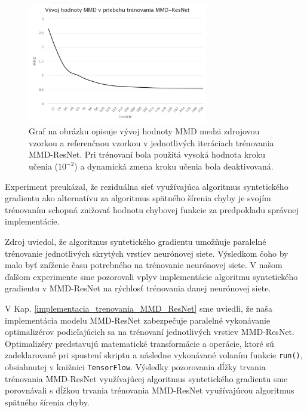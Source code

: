 \begin{figure}
\centerline{\includegraphics[width=0.7\textwidth]{images/experimenty/experiment1.png}}
\caption[Vývoj hodnoty MMD v priebehu trénovania MMD-ResNet]{Graf na obrázku opisuje vývoj hodnoty MMD medzi zdrojovou vzorkou a referenčnou vzorkou v jednotlivých iteráciach trénovania MMD-ResNet. Pri trénovaní bola použitá vysoká hodnota kroku učenia ($10^{-2}$) a dynamická zmena kroku učenia bola deaktivovaná.}
\label{vysledok1}
\end{figure}

Experiment preukázal, že reziduálna sieť využívajúca algoritmus syntetického gradientu ako alternatívu za algoritmus spätného šírenia chyby je svojím trénovaním schopná znižovať hodnotu chybovej funkcie za predpokladu správnej implementácie.

Zdroj \cite{Jaderberg2016} uviedol, že algoritmus syntetického gradientu umožňuje paralelné trénovanie jednotlivých skrytých vrstiev neurónovej siete. Výsledkom čoho by malo byť zníženie času potrebného na trénovanie neurónovej siete. V našom ďalšom experimente sme pozorovali vplyv implementácie algoritmu syntetického gradientu v MMD-ResNet na rýchlosť trénovania danej neurónovej siete. 

V Kap. \ref{implementacia_trenovania_MMD_ResNet} sme uviedli, že naša implementácia modelu MMD-ResNet zabezpečuje paralelné vykonávanie optimalizérov podieľajúcich sa na trénovaní jednotlivých vrstiev MMD-ResNet. Optimalizéry predstavujú matematické transformácie a operácie, ktoré sú zadeklarované pri spustení skriptu a následne vykonávané volaním funkcie \texttt{run()}, obsiahnutej v knižnici \texttt{TensorFlow}. Výsledky pozorovania dĺžky trvania trénovania MMD-ResNet využívajúcej algoritmus syntetického gradientu sme porovnávali s dĺžkou trvania trénovania MMD-ResNet využívajúcou algoritmus spätného šírenia chyby. 

